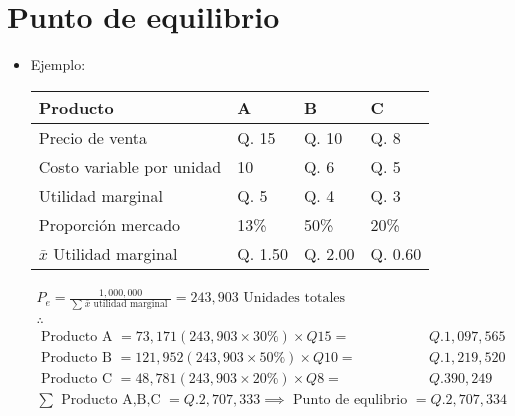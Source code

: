 \section{Punto de equilibrio}
\begin{itemize}
    \item Ejemplo: 
        \begin{center}
           \begin{tabular}{ | l | l | l | l | }
               \hline
                    Producto & A & B & C    \\ 
                \hline
                    Precio de venta & Q. 15 & Q. 10 & Q. 8 \\  
                    Costo variable por unidad & 10 & Q. 6 & Q. 5\\ 
                    Utilidad marginal & Q. 5 & Q. 4 & Q. 3 \\ 
               \hline
               Proporción mercado & 13\% & 50\% & 20\% \\ 
               $\bar{x}$ Utilidad marginal & Q. 1.50 & Q. 2.00 & Q. 0.60 \\ 
               \hline
           \end{tabular}
            \begin{align*}
                P_e = \frac{1,000,000}{\sum_{}^{}\bar{x}\text{  utilidad marginal  }} = 243,903 \text{  Unidades totales  } \\ 
                \therefore \quad \\ 
                \text{  Producto A  } = 73,171 (243,903 \times 30\%) \times Q15 =& Q. 1,097,565 \\ 
                \text{  Producto B  } = 121,952 (243,903 \times 50\%) \times Q10 =& Q. 1,219,520 \\ 
                \text{  Producto C  } = 48,781 (243,903 \times 20\%) \times Q8 =& Q. 390,249 \\ 
                \sum_{}^{}\text{  Producto A,B,C  } = Q. 2,707,333 \implies \text{  Punto de equlibrio  } = Q. 2,707,334 \\ 
            \end{align*}
        \end{center}
\end{itemize}
